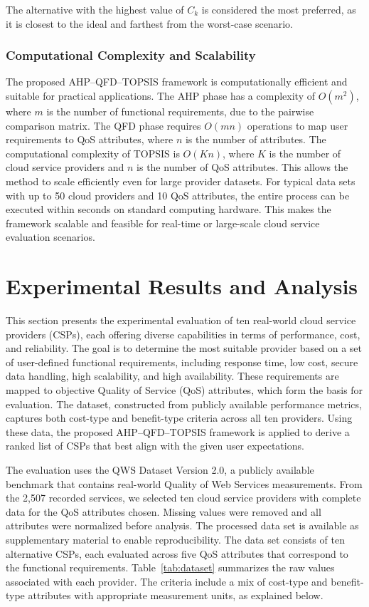 \documentclass[twocolumn]{svjour3}
\begin{document}
The alternative with the highest value of $C_k$ is considered the most preferred, as it is closest to the ideal and farthest from the worst-case scenario.
\subsubsection*{Computational Complexity and Scalability}

The proposed AHP--QFD--TOPSIS framework is computationally efficient and suitable for practical applications. 
The AHP phase has a complexity of \(O(m^2)\), where \(m\) is the number of functional requirements, due to the pairwise comparison matrix. 
The QFD phase requires \(O(mn)\) operations to map user requirements to QoS attributes, where \(n\) is the number of attributes. 
The computational complexity of TOPSIS is \(O(Kn)\), where \(K\) is the number of cloud service providers and \(n\) is the number of QoS attributes. This allows the method to scale efficiently even for large provider datasets.
For typical data sets with up to 50 cloud providers and 10 QoS attributes, the entire process can be executed within seconds on standard computing hardware. 
This makes the framework scalable and feasible for real-time or large-scale cloud service evaluation scenarios.

\section{Experimental Results and Analysis}

This section presents the experimental evaluation of ten real-world cloud service providers (CSPs), each offering diverse capabilities in terms of performance, cost, and reliability. The goal is to determine the most suitable provider based on a set of user-defined functional requirements, including response time, low cost, secure data handling, high scalability, and high availability. These requirements are mapped to objective Quality of Service (QoS) attributes, which form the basis for evaluation. The dataset, constructed from publicly available performance metrics, captures both cost-type and benefit-type criteria across all ten providers. Using these data, the proposed AHP–QFD–TOPSIS framework is applied to derive a ranked list of CSPs that best align with the given user expectations.

The evaluation uses the QWS Dataset Version 2.0, a publicly available benchmark that contains real-world Quality of Web Services measurements. From the 2,507 recorded services, we selected ten cloud service providers with complete data for the QoS attributes chosen. Missing values were removed and all attributes were normalized before analysis. The processed data set is available as supplementary material to enable reproducibility. The data set consists of ten alternative CSPs, each evaluated across five QoS attributes that correspond to the functional requirements. Table~\ref{tab:dataset} summarizes the raw values associated with each provider. The criteria include a mix of cost-type and benefit-type attributes with appropriate measurement units, as explained below.
\end{document}
